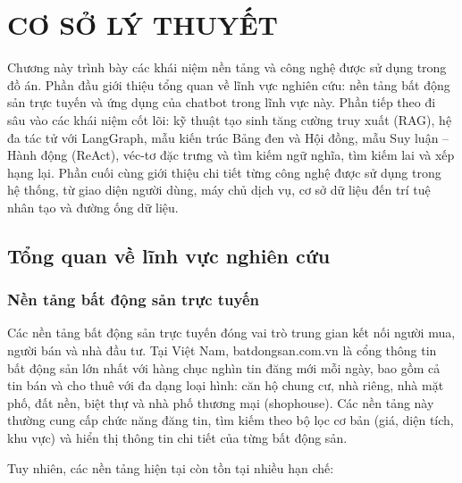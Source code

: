 \chapter{CƠ SỞ LÝ THUYẾT}

Chương này trình bày các khái niệm nền tảng và công nghệ được sử dụng trong đồ án. Phần đầu giới thiệu tổng quan về lĩnh vực nghiên cứu: nền tảng bất động sản trực tuyến và ứng dụng của chatbot trong lĩnh vực này. Phần tiếp theo đi sâu vào các khái niệm cốt lõi: kỹ thuật tạo sinh tăng cường truy xuất (RAG), hệ đa tác tử với LangGraph, mẫu kiến trúc Bảng đen và Hội đồng, mẫu Suy luận -- Hành động (ReAct), véc-tơ đặc trưng và tìm kiếm ngữ nghĩa, tìm kiếm lai và xếp hạng lại. Phần cuối cùng giới thiệu chi tiết từng công nghệ được sử dụng trong hệ thống, từ giao diện người dùng, máy chủ dịch vụ, cơ sở dữ liệu đến trí tuệ nhân tạo và đường ống dữ liệu.

\section{Tổng quan về lĩnh vực nghiên cứu}

\subsection{Nền tảng bất động sản trực tuyến}

Các nền tảng bất động sản trực tuyến đóng vai trò trung gian kết nối người mua, người bán và nhà đầu tư. Tại Việt Nam, batdongsan.com.vn là cổng thông tin bất động sản lớn nhất với hàng chục nghìn tin đăng mới mỗi ngày, bao gồm cả tin bán và cho thuê với đa dạng loại hình: căn hộ chung cư, nhà riêng, nhà mặt phố, đất nền, biệt thự và nhà phố thương mại (shophouse). Các nền tảng này thường cung cấp chức năng đăng tin, tìm kiếm theo bộ lọc cơ bản (giá, diện tích, khu vực) và hiển thị thông tin chi tiết của từng bất động sản.

Tuy nhiên, các nền tảng hiện tại còn tồn tại nhiều hạn chế:

